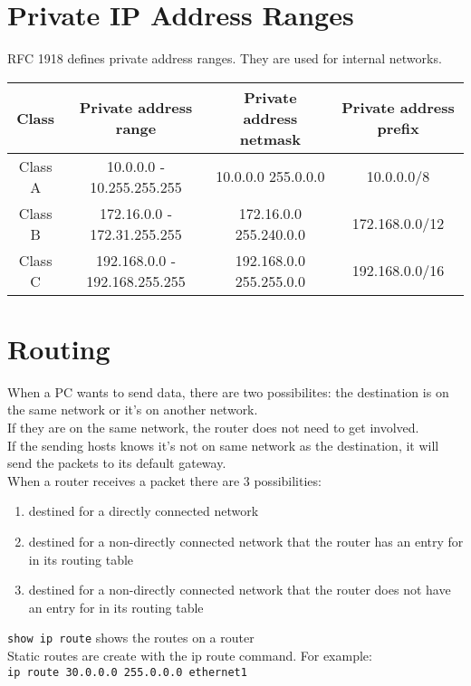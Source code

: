 \documentclass{article}
\begin{document}
\section{Private IP Address Ranges}

RFC 1918 defines private address ranges. They are used for internal networks.\\

\begin{tabular}{ | c | c | c | c | }
\hline
Class & Private address range & Private address netmask & Private address prefix \\ \hline
Class A & 10.0.0.0 - 10.255.255.255 & 10.0.0.0 255.0.0.0 & 10.0.0.0/8 \\ \hline
Class B & 172.16.0.0 - 172.31.255.255 & 172.16.0.0 255.240.0.0 & 172.168.0.0/12 \\ \hline
Class C & 192.168.0.0 - 192.168.255.255 & 192.168.0.0 255.255.0.0 & 192.168.0.0/16 \\ \hline
\end{tabular}

\section{Routing}

When a PC wants to send data, there are two possibilites: the destination
is on the same network or it's on another network.\\

If they are on the same network, the router does not need to get involved.\\

If the sending hosts knows it's not on same network as the destination, it will
send the packets to its default gateway.\\

When a router receives a packet there are 3 possibilities:

\begin{enumerate}

\item destined for a directly connected network
\item destined for a non-directly connected network that the router has an
entry for in its routing table
\item destined for a non-directly connected network that the router does not
have an entry for in its routing table

\end{enumerate}

\texttt{show ip route} shows the routes on a router\\

Static routes are create with the ip route command. For example:\\

\texttt{ip route 30.0.0.0 255.0.0.0 ethernet1}\\
\end{document}
